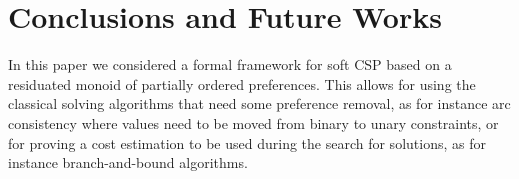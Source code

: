 \documentclass[a4paper]{elsarticle}
\newcommand{\1}{\mathbf{1}}
\def\odiv{{ \ominus\hspace{-8pt}:}\;}
\begin{document}
\section{Conclusions and Future Works}\label{sec:conclusion}
In this paper we considered a formal framework for soft CSP based on a residuated monoid of partially ordered preferences. 
This allows for using the classical solving algorithms that need some preference removal, as for instance arc consistency where values need to be moved 
from binary to unary constraints, or for proving a cost estimation to be used during the search for solutions, as for instance branch-and-bound algorithms.
%
%

%









\end{document}
